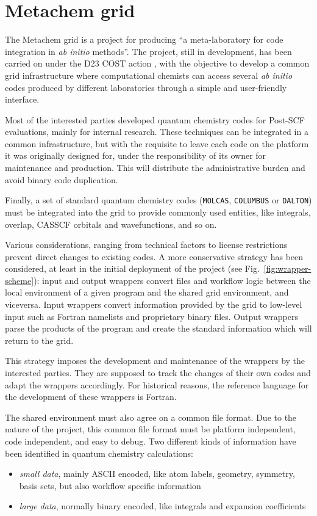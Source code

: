 \section{Metachem grid}

The Metachem grid is a project for producing ``a meta-laboratory for code
integration in \textit{ab initio} methods''. The project, still in
development, has been carried on under the D23 COST action \cite{cost-site},
with the objective to develop a common grid infrastructure where
computational chemists can access several \textit{ab initio} codes produced
by different laboratories through a simple and user-friendly interface.

Most of the interested parties developed quantum chemistry codes for
{Post-SCF} evaluations, mainly for internal research. These techniques can be
integrated in a common infrastructure, but with the requisite to leave each code
on the platform it was originally designed for, under the responsibility of
its owner for maintenance and production. This will distribute the
administrative burden and avoid binary code duplication.

Finally, a set of standard quantum chemistry codes (\texttt{MOLCAS},
\texttt{COLUMBUS} or \texttt{DALTON}) must be integrated into the grid to
provide commonly used entities, like integrals, overlap, CASSCF orbitals and
wavefunctions, and so on.

Various considerations, ranging from technical factors to license
restrictions prevent direct changes to existing codes. A more conservative
strategy has been considered, at least in the initial deployment of the
project (see Fig.~\ref{fig:wrapper-scheme}): input and output wrappers
convert files and workflow logic between the local environment of a given
program and the shared grid environment, and viceversa. Input wrappers
convert information provided by the grid to low-level input such as Fortran
namelists and proprietary binary files. Output wrappers parse the products
of the program and create the standard information which will return to the
grid.



This strategy imposes the development and maintenance of the wrappers by
the interested parties. They are supposed to track the changes of their own
codes and adapt the wrappers accordingly. For historical reasons,
the reference language for the development of these wrappers is Fortran. 

The shared environment must also agree on a common file format.  Due to the
nature of the project, this common file format must be platform independent,
code independent, and easy to debug. Two different kinds of information have
been identified in quantum chemistry calculations:
\begin{itemize}
\item \textit{small data}, mainly ASCII encoded, like atom labels, geometry,
symmetry, basis sets, but also workflow specific information
\item \textit{large data}, normally binary encoded, like integrals and expansion coefficients
\end{itemize}

